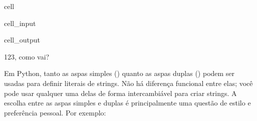 \documentclass[letterpaper,10pt,english]{jupyterBook}
\begin{document}
\begin{sphinxuseclass}{cell}\begin{sphinxVerbatimInput}

\begin{sphinxuseclass}{cell_input}
\begin{sphinxVerbatim}[commandchars=\\\{\}]
  

  

  
\end{sphinxVerbatim}

\end{sphinxuseclass}\end{sphinxVerbatimInput}
\begin{sphinxVerbatimOutput}

\begin{sphinxuseclass}{cell_output}
\begin{sphinxVerbatim}[commandchars=\\\{\}]
123, como vai?
\end{sphinxVerbatim}

\end{sphinxuseclass}\end{sphinxVerbatimOutput}

\end{sphinxuseclass}
\sphinxAtStartPar
Em Python, tanto as aspas simples () quanto as aspas duplas () podem ser usadas para definir literais de strings. Não há diferença funcional entre elas; você pode usar qualquer uma delas de forma intercambiável para criar strings. A escolha entre as aspas simples e duplas é principalmente uma questão de estilo e preferência pessoal. Por exemplo:

\begin{sphinxVerbatim}[commandchars=\\\{\}]
  
  
\end{sphinxVerbatim}
\end{document}
